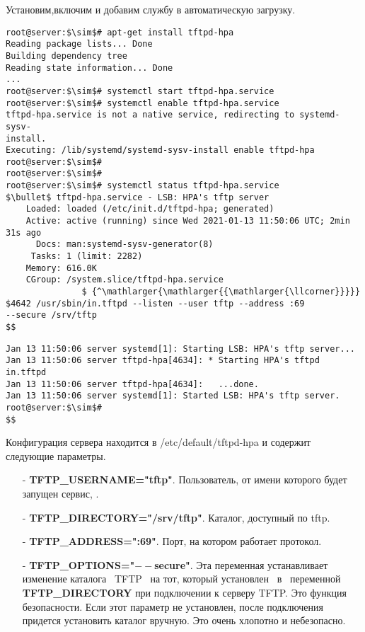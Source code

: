 \documentclass[14pt, a4paper]{article}
\begin{document}
Установим,включим и добавим службу в автоматическую загрузку.

\vspace{0.3cm}
\begin{lstlisting}
root@server:$\sim$# apt-get install tftpd-hpa
Reading package lists... Done
Building dependency tree
Reading state information... Done
...
root@server:$\sim$# systemctl start tftpd-hpa.service
root@server:$\sim$# systemctl enable tftpd-hpa.service
tftpd-hpa.service is not a native service, redirecting to systemd-sysv-
install.
Executing: /lib/systemd/systemd-sysv-install enable tftpd-hpa
root@server:$\sim$#
root@server:$\sim$#
root@server:$\sim$# systemctl status tftpd-hpa.service
$\bullet$ tftpd-hpa.service - LSB: HPA's tftp server
    Loaded: loaded (/etc/init.d/tftpd-hpa; generated)
    Active: active (running) since Wed 2021-01-13 11:50:06 UTC; 2min 31s ago
      Docs: man:systemd-sysv-generator(8)
     Tasks: 1 (limit: 2282)
    Memory: 616.0K
    CGroup: /system.slice/tftpd-hpa.service
               $ {^\mathlarger{\mathlarger{{\mathlarger{\llcorner}}}}} $4642 /usr/sbin/in.tftpd --listen --user tftp --address :69
--secure /srv/tftp
$$
\end{lstlisting}
\newpage

\begin{lstlisting}
Jan 13 11:50:06 server systemd[1]: Starting LSB: HPA's tftp server...
Jan 13 11:50:06 server tftpd-hpa[4634]: * Starting HPA's tftpd in.tftpd
Jan 13 11:50:06 server tftpd-hpa[4634]:   ...done.
Jan 13 11:50:06 server systemd[1]: Started LSB: HPA's tftp server.
root@server:$\sim$#
$$
\end{lstlisting}
\vspace{0.2cm}

Конфигурация сервера находится в /etc/default/tftpd-hpa и содержит следующие параметры.

\begin{itemize}
    \item[-] \textbf{TFTP\_USERNAME="tftp"}. Пользователь, от имени которого будет запущен сервис, 
    .
    \item[-] \textbf{TFTP\_DIRECTORY="/srv/tftp"}. Каталог, доступный по tftp.
    \item[-] \textbf{TFTP\_ADDRESS=":69"}. Порт, на котором работает протокол.
    \item[-] \textbf{TFTP\_OPTIONS="$--$secure"}. Эта переменная устанавливает изменение каталога \ TFTP \ на тот,
    который установлен \ в \ переменной \\ \textbf{TFTP\_DIRECTORY} при подключении к серверу TFTP. Это
    функция безопасности. Если этот параметр не установлен, после подключения придется
    установить каталог вручную. Это очень хлопотно и небезопасно. 
\end{itemize}
\end{document}
